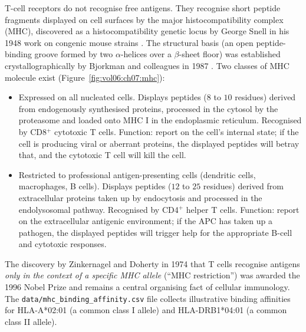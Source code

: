  T-cell receptors do not
recognise free antigens. They recognise short peptide fragments
displayed on cell surfaces by the major histocompatibility complex
(MHC), discovered as a histocompatibility genetic locus by George
Snell in his 1948 work on congenic mouse strains
\cite{paper:v6c07-snell-mhc-1948}. The structural basis (an open
peptide-binding groove formed by two $\alpha$-helices over a
$\beta$-sheet floor) was established crystallographically by
Bjorkman and colleagues in 1987 \cite{paper:v6c07-bjorkman-1987}. Two
classes of MHC molecule exist
(Figure~\ref{fig:vol06:ch07:mhc}):

\begin{itemize}
\item {} Expressed on all nucleated cells.
Displays peptides ($8$ to $10$ residues) derived from endogenously
synthesised proteins, processed in the cytosol by the proteasome and
loaded onto MHC I in the endoplasmic reticulum. Recognised by
CD8$^+$ cytotoxic T cells. Function: report on the cell's internal
state; if the cell is producing viral or aberrant proteins, the
displayed peptides will betray that, and the cytotoxic T cell will
kill the cell.

\item {} Restricted to professional
antigen-presenting cells (dendritic cells, macrophages, B cells).
Displays peptides ($12$ to $25$ residues) derived from extracellular
proteins taken up by endocytosis and processed in the endolysosomal
pathway. Recognised by CD4$^+$ helper T cells. Function: report on
the extracellular antigenic environment; if the APC has taken up a
pathogen, the displayed peptides will trigger help for the appropriate
B-cell and cytotoxic responses.
\end{itemize}

The discovery by Zinkernagel and Doherty in 1974
\cite{paper:v6c07-zinkernagel-doherty-1974} that T cells recognise
antigens \emph{only in the context of a specific MHC allele} (``MHC
restriction'') was awarded the 1996 Nobel Prize and remains a central
organising fact of cellular immunology. The
\verb|data/mhc_binding_affinity.csv| file collects illustrative
binding affinities for HLA-A*02:01 (a common class I allele) and
HLA-DRB1*04:01 (a common class II allele).

